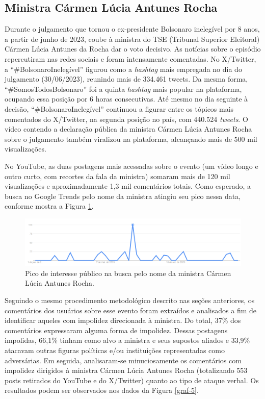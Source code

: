 \documentclass[portuguese]{textolivre}
\begin{document}
\subsection{Ministra Cármen Lúcia Antunes Rocha}
Durante o julgamento que tornou o ex-presidente Bolsonaro inelegível por 8 anos, a partir de junho de 2023, coube à ministra do TSE (Tribunal Superior Eleitoral) Cármen Lúcia Antunes da Rocha dar o voto decisivo. As notícias sobre o episódio repercutiram nas redes sociais e foram intensamente comentadas. No X/Twitter, a ``\#BolsonaroInelegível'' figurou como a \textit{hashtag} mais empregada no dia do julgamento (30/06/2023), reunindo mais de 334.461 tweets. Da mesma forma, ``\#SomosTodosBolsonaro'' foi a quinta \textit{hashtag} mais popular na plataforma, ocupando essa posição por 6 horas consecutivas. Até mesmo no dia seguinte à decisão, ``\#BolsonaroInelegível'' continuou a figurar entre os tópicos mais comentados do X/Twitter, na segunda posição no país, com 440.524 \textit{tweets}. O vídeo contendo a declaração pública da ministra Cármen Lúcia Antunes Rocha sobre o julgamento também viralizou na plataforma, alcançando mais de 500 mil visualizações.

No YouTube, as duas postagens mais acessadas sobre o evento (um vídeo longo e outro curto, com recortes da fala da ministra) somaram mais de 120 mil visualizações e aproximadamente 1,3 mil comentários totais. Como esperado, a busca no Google Trends pelo nome da ministra atingiu seu pico nessa data, conforme mostra a Figura \ref{graf-4}.

\begin{figure}[h!]
\centering
\begin{minipage}{.90\textwidth}
\includegraphics[width =\textwidth]{Fig6.png}
\caption{Pico de interesse público na busca pelo nome da ministra Cármen Lúcia Antunes Rocha.}
\label{graf-4}
\end{minipage}
\end{figure}

Seguindo o mesmo procedimento metodológico descrito nas seções anteriores, os comentários dos usuários sobre esse evento foram extraídos e analisados a fim de identificar aqueles com impolidez direcionada à ministra. Do total, 37\% dos comentários expressaram alguma forma de impolidez. Dessas postagens impolidas, 66,1\% tinham como alvo a ministra e seus supostos aliados e 33,9\% atacavam outras figuras políticas e/ou instituições representadas como adversárias. Em seguida, analisaram-se minuciosamente os comentários com impolidez dirigidos à ministra Cármen Lúcia Antunes Rocha (totalizando 553 posts retirados do YouTube e do X/Twitter) quanto ao tipo de ataque verbal. Os resultados podem ser observados nos dados da Figura \ref{graf-5}.
\end{document}
